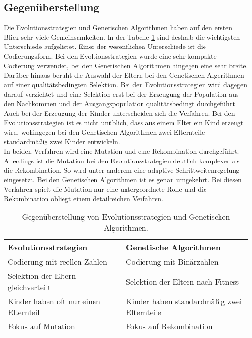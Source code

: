 \subsection{Gegenüberstellung}
Die Evolutionsstrategien und Genetischen Algorithmen haben auf den ersten Blick sehr viele Gemeinsamkeiten. In der Tabelle \ref{tab:kontra} sind deshalb die wichtigsten Unterschiede aufgelistet. 
Einer der wesentlichen Unterschiede ist die Codierungsform. Bei den Evoltionsstrategien wurde eine sehr kompakte Codierung verwendet, bei den Genetischen Algorithmen hingegen eine sehr breite.
Darüber hinaus beruht die Auswahl der Eltern bei den Genetischen Algorithmen auf einer qualitätsbedingten Selektion. Bei den Evolutionsstrategien wird dagegen darauf verzichtet und eine Selektion erst bei der Erzeugung der Population aus den Nachkommen und der Ausgangspopulation qualitätsbedingt durchgeführt.
Auch bei der Erzeugung der Kinder unterscheiden sich die Verfahren. Bei den Evolutionsstrategien ist es nicht unüblich, dass aus einem Elter ein Kind erzeugt wird, wohingegen bei den Genetischen Algorithmen zwei Elternteile standardmäßig zwei Kinder entwickeln.\\
In beiden Verfahren wird eine Mutation und eine Rekombination durchgeführt. Allerdings ist die Mutation bei den Evolutionsstrategien deutlich komplexer als die Rekombination. So wird unter anderem eine adaptive Schrittweitenregelung eingesetzt. Bei den Genetischen Algorithmen ist es genau umgekehrt. Bei diesen Verfahren spielt die Mutation nur eine untergeordnete Rolle und die Rekombination obliegt einem detailreichen Verfahren.
\begin{table}[!htb]
\centering
\begin{tabular}[h]{l|l}
Evolutionsstrategien & Genetische Algorithmen \\
\hline
Codierung mit reellen Zahlen & Codierung mit Binärzahlen \\
Selektion der Eltern gleichverteilt & Selektion der Eltern nach Fitness \\
Kinder haben oft nur einen Elternteil & Kinder haben standardmäßig zwei Elternteile \\
Fokus auf Mutation & Fokus auf Rekombination \\
\end{tabular}
\caption{\label{tab:kontra}Gegenüberstellung von Evolutionsstrategien und Genetischen Algorithmen.}
\end{table}

